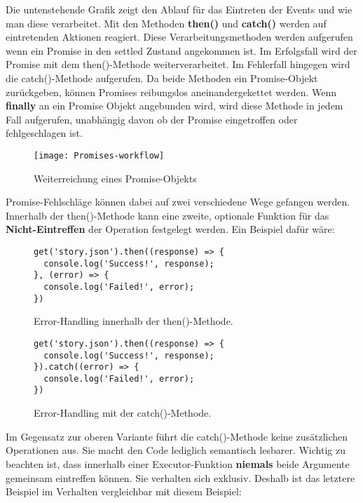 \noindent
Die untenstehende Grafik zeigt den Ablauf für das Eintreten der Events und wie man diese verarbeitet. Mit den Methoden \textbf{then()} und \textbf{catch()} werden auf eintretenden Aktionen reagiert. Diese Verarbeitungsmethoden werden aufgerufen wenn ein Promise in den settled Zustand angekommen ist. Im Erfolgsfall wird der Promise mit dem then()-Methode weiterverarbeitet. Im Fehlerfall hingegen wird die catch()-Methode aufgerufen. Da beide Methoden ein Promise-Objekt zurückgeben, können Promises reibungslos aneinandergekettet werden. Wenn \textbf{finally} an ein Promise Objekt angebunden wird, wird diese Methode in jedem Fall aufgerufen, unabhängig davon ob der Promise eingetroffen oder fehlgeschlagen ist.


\begin{figure}[H]
\texttt{[image: Promises-workflow]}
\caption{Weiterreichung eines Promise-Objekts \cite{promise-executor}}
\end{figure}

\noindent
Promise-Fehlschläge können dabei auf zwei verschiedene Wege gefangen werden. Innerhalb der then()-Methode kann eine zweite, optionale Funktion für das \textbf{Nicht-Eintreffen} der Operation festgelegt werden. Ein Beispiel dafür wäre:

\begin{figure}[H]
\begin{lstlisting}[basicstyle=\small]
get('story.json').then((response) => {
  console.log('Success!', response);
}, (error) => {
  console.log('Failed!', error);
})
\end{lstlisting}
\caption{Error-Handling innerhalb der then()-Methode. \cite{callback-vs-promises}}
\end{figure}

\begin{figure}[H]
\begin{lstlisting}[basicstyle=\small]
get('story.json').then((response) => {
  console.log('Success!', response);
}).catch((error) => {
  console.log('Failed!', error);
})
\end{lstlisting}
\caption{Error-Handling mit der catch()-Methode. \cite{callback-vs-promises}}
\end{figure}

\noindent
Im Gegensatz zur oberen Variante führt die catch()-Methode keine zusätzlichen Operationen aus. Sie macht den Code lediglich semantisch lesbarer. Wichtig zu beachten ist, dass innerhalb einer Executor-Funktion \textbf{niemals} beide Argumente gemeinsam eintreffen können. Sie verhalten sich exklusiv. Deshalb ist das letztere Beispiel im Verhalten vergleichbar mit diesem Beispiel:

